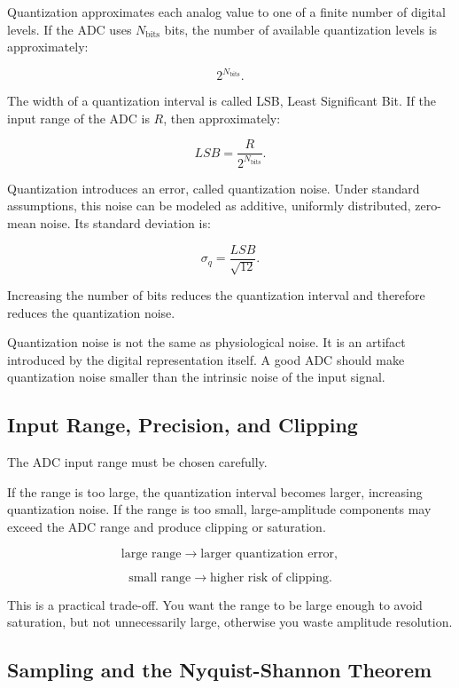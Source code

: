 Quantization approximates each analog value to one of a finite number of digital levels. If the ADC uses $N_{\text{bits}}$ bits, the number of available quantization levels is approximately:

\[
2^{N_{\text{bits}}}.
\]

The width of a quantization interval is called LSB, Least Significant Bit. If the input range of the ADC is $R$, then approximately:

\[
LSB =
\frac{R}{2^{N_{\text{bits}}}}.
\]

Quantization introduces an error, called quantization noise. Under standard assumptions, this noise can be modeled as additive, uniformly distributed, zero-mean noise. Its standard deviation is:

\[
\sigma_q =
\frac{LSB}{\sqrt{12}}.
\]

Increasing the number of bits reduces the quantization interval and therefore reduces the quantization noise.

\begin{authornote}
Quantization noise is not the same as physiological noise. It is an artifact introduced by the digital representation itself. A good ADC should make quantization noise smaller than the intrinsic noise of the input signal.
\end{authornote}

\subsection{Input Range, Precision, and Clipping}

The ADC input range must be chosen carefully.

If the range is too large, the quantization interval becomes larger, increasing quantization noise. If the range is too small, large-amplitude components may exceed the ADC range and produce clipping or saturation.

\[
\text{large range}
\rightarrow
\text{larger quantization error},
\]

\[
\text{small range}
\rightarrow
\text{higher risk of clipping}.
\]

\begin{authornote}
This is a practical trade-off. You want the range to be large enough to avoid saturation, but not unnecessarily large, otherwise you waste amplitude resolution.
\end{authornote}

\subsection{Sampling and the Nyquist-Shannon Theorem}


